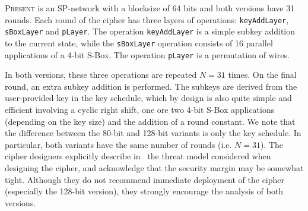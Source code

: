\documentclass{llncs}
\newcommand{\PRESENT}{\textsc{Present}\xspace}
\begin{document}
\PRESENT is an SP-network with a blocksize of 64 bits and both versions have
31
rounds. Each round of the cipher has three layers of operations:
\texttt{keyAddLayer}, \texttt{sBoxLayer} and \texttt{pLayer}. The operation
\texttt{keyAddLayer} is a simple subkey addition to the
current state, while the \texttt{sBoxLayer} operation consists of 16 parallel
applications of a 4-bit S-Box.
The operation
\texttt{pLayer} is a permutation of wires.

In both versions, these three operations are repeated $N=31$ times. On the
final round, an extra subkey addition is performed. The subkeys are derived from
the user-provided key in the key schedule, which by design is also
quite simple and efficient involving a cyclic right shift, one ore two 4-bit
S-Box applications (depending on the key size) and the addition of a round
constant.
We note that the difference
between the 80-bit and 128-bit variants is only the key schedule. In particular,
both variants have the same number of rounds (i.e. $N=31$). The cipher
designers explicitly describe in~\cite{present} the threat model considered when
designing the cipher, and acknowledge that the security margin may be somewhat
tight. Although they do not recommend immediate deployment of the cipher
(especially the 128-bit version), they strongly encourage the analysis of both
versions.
\end{document}
